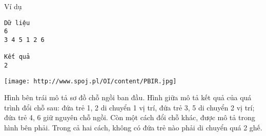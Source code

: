 Ví dụ  
\begin{verbatim}
Dữ liệu
6
3 4 5 1 2 6

Kết quả
2
\end{verbatim}
\texttt{[image: http://www.spoj.pl/OI/content/PBIR.jpg]}

   Hình bên trái mô tả sơ đồ chỗ ngồi ban đầu. Hình giữa mô tả kết quả của quá trình đổi chỗ sau: đứa trẻ 1, 2 di chuyển 1 vị trí, đứa trẻ 3, 5 di chuyển 2 vị trí; đứa trẻ 4, 6 giữ nguyên chỗ ngồi. Còn một cách đổi chỗ khác, được mô tả trong hình bên phải. Trong cả hai cách, không có đứa trẻ nào phải di chuyển quá 2 ghế.